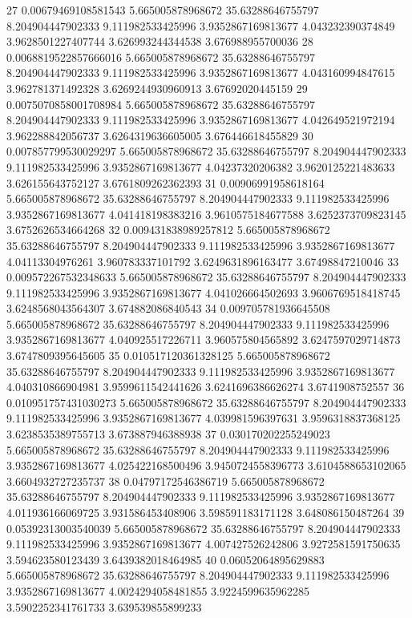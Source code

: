 {27 0.00679469108581543 5.665005878968672 35.63288646755797 8.204904447902333 9.111982533425996 3.9352867169813677 4.043232390374849 3.9628501227407744 3.626993244344538 3.676988955700036
28 0.0068819522857666016 5.665005878968672 35.63288646755797 8.204904447902333 9.111982533425996 3.9352867169813677 4.043160994847615 3.962781371492328 3.6269244930960913 3.67692020445159
29 0.0075070858001708984 5.665005878968672 35.63288646755797 8.204904447902333 9.111982533425996 3.9352867169813677 4.042649521972194 3.962288842056737 3.6264319636605005 3.676446618455829
30 0.007857799530029297 5.665005878968672 35.63288646755797 8.204904447902333 9.111982533425996 3.9352867169813677 4.04237320206382 3.9620125221483633 3.626155643752127 3.6761809262362393
31 0.00906991958618164 5.665005878968672 35.63288646755797 8.204904447902333 9.111982533425996 3.9352867169813677 4.041418198383216 3.9610575184677588 3.6252373709823145 3.6752626534664268
32 0.009431838989257812 5.665005878968672 35.63288646755797 8.204904447902333 9.111982533425996 3.9352867169813677 4.04113304976261 3.960783337101792 3.6249631896163477 3.67498847210046
33 0.009572267532348633 5.665005878968672 35.63288646755797 8.204904447902333 9.111982533425996 3.9352867169813677 4.041026664502693 3.9606769518418745 3.6248568043564307 3.674882086840543
34 0.009705781936645508 5.665005878968672 35.63288646755797 8.204904447902333 9.111982533425996 3.9352867169813677 4.040925517226711 3.960575804565892 3.6247597029714873 3.6747809395645605
35 0.010517120361328125 5.665005878968672 35.63288646755797 8.204904447902333 9.111982533425996 3.9352867169813677 4.040310866904981 3.9599611542441626 3.6241696386626274 3.6741908752557
36 0.010951757431030273 5.665005878968672 35.63288646755797 8.204904447902333 9.111982533425996 3.9352867169813677 4.039981596397631 3.9596318837368125 3.6238535389755713 3.673887946388938
37 0.030170202255249023 5.665005878968672 35.63288646755797 8.204904447902333 9.111982533425996 3.9352867169813677 4.025422168500496 3.9450724558396773 3.6104588653102065 3.6604932727235737
38 0.04797172546386719 5.665005878968672 35.63288646755797 8.204904447902333 9.111982533425996 3.9352867169813677 4.011936166069725 3.931586453408906 3.598591183171128 3.648086150487264
39 0.05392313003540039 5.665005878968672 35.63288646755797 8.204904447902333 9.111982533425996 3.9352867169813677 4.007427526242806 3.9272581591750635 3.594623580123439 3.6439382018464985
40 0.06052064895629883 5.665005878968672 35.63288646755797 8.204904447902333 9.111982533425996 3.9352867169813677 4.0024294058481855 3.9224599635962285 3.5902252341761733 3.639539855899233
}
